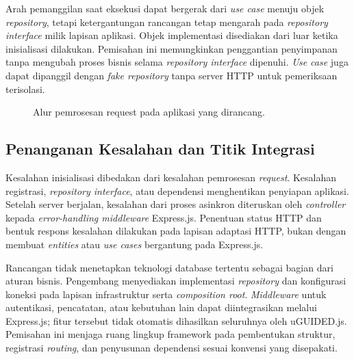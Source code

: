 \documentclass[12pt,a4paper,oneside]{report}
\begin{document}
Arah pemanggilan saat eksekusi dapat bergerak dari \textit{use case} menuju objek \textit{repository}, tetapi ketergantungan rancangan tetap mengarah pada \textit{repository interface} milik lapisan aplikasi. Objek implementasi disediakan dari luar ketika inisialisasi dilakukan. Pemisahan ini memungkinkan penggantian penyimpanan tanpa mengubah proses bisnis selama \textit{repository interface} dipenuhi. \textit{Use case} juga dapat dipanggil dengan \textit{fake repository} tanpa server HTTP untuk pemeriksaan terisolasi.

\begin{figure}[!htbp]
\centering
\begin{singlespace}
\end{singlespace}
\caption{Alur pemrosesan request pada aplikasi yang dirancang.}
\label{fig:request_uguided}
\end{figure}
\FloatBarrier

\subsection{Penanganan Kesalahan dan Titik Integrasi}
Kesalahan inisialisasi dibedakan dari kesalahan pemrosesan \textit{request}. Kesalahan registrasi, \textit{repository interface}, atau dependensi menghentikan penyiapan aplikasi. Setelah server berjalan, kesalahan dari proses asinkron diteruskan oleh \textit{controller} kepada \textit{error-handling middleware} Express.js. Penentuan status HTTP dan bentuk respons kesalahan dilakukan pada lapisan adaptasi HTTP, bukan dengan membuat \textit{entities} atau \textit{use cases} bergantung pada Express.js.

Rancangan tidak menetapkan teknologi database tertentu sebagai bagian dari aturan bisnis. Pengembang menyediakan implementasi \textit{repository} dan konfigurasi koneksi pada lapisan infrastruktur serta \textit{composition root}. \textit{Middleware} untuk autentikasi, pencatatan, atau kebutuhan lain dapat diintegrasikan melalui Express.js; fitur tersebut tidak otomatis dihasilkan seluruhnya oleh uGUIDED.js. Pemisahan ini menjaga ruang lingkup framework pada pembentukan struktur, registrasi \textit{routing}, dan penyusunan dependensi sesuai konvensi yang disepakati.
\end{document}
